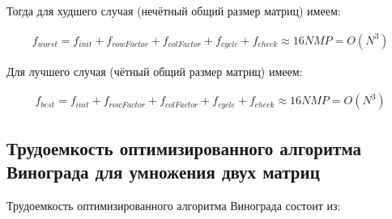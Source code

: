 Тогда для худшего случая (нечётный общий размер матриц) имеем:

\begin{equation}
	\label{eq:vinograd_worst}
	\begin{gathered}
		f_{worst} = f_{init} + f_{rowFactor} + f_{colFactor} + f_{cycle} + f_{check} \approx 16NMP = O(N^3)
	\end{gathered}
\end{equation}

Для лучшего случая (чётный общий размер матриц) имеем:

\begin{equation}
	\label{eq:vinograd_best}
	\begin{gathered}
		f_{best} = f_{init} + f_{rowFactor} + f_{colFactor} + f_{cycle} + f_{check} \approx 16NMP = O(N^3)
	\end{gathered}
\end{equation}

\clearpage

\subsection{Трудоемкость оптимизированного алгоритма Винограда для умножения двух матриц}

Трудоемкость оптимизированного алгоритма Винограда состоит из:

